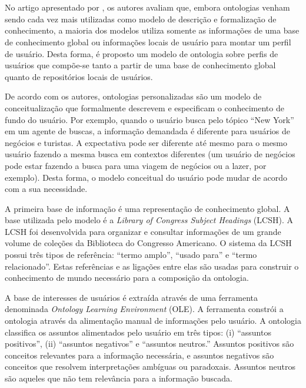 
\section{}

No artigo apresentado por , os autores avaliam que, embora ontologias venham sendo cada vez mais utilizadas como modelo de descrição e formalização de conhecimento, a maioria dos modelos utiliza somente as informações de uma base de conhecimento global ou informações locais de usuário para montar um perfil de usuário. Desta forma, é proposto um modelo de ontologia sobre perfis de usuários que compõe-se tanto a partir de uma base de conhecimento global quanto de repositórios locais de usuários.

De acordo com os autores, ontologias personalizadas são um modelo de conceitualização que formalmente descrevem e especificam o conhecimento de fundo do usuário. Por exemplo, quando o usuário busca pelo tópico ``New York'' em um agente de buscas, a informação demandada é diferente para usuários de negócios e turistas. A expectativa pode ser diferente até mesmo para o mesmo usuário fazendo a mesma busca em contextos diferentes (um usuário de negócios pode estar fazendo a busca para uma viagem de negócios ou a lazer, por exemplo). Desta forma, o modelo conceitual do usuário pode mudar de acordo com a sua necessidade.

A primeira base de informação é uma representação de conhecimento global. A base utilizada pelo modelo é a {\it Library of Congress Subject Headings} (LCSH). A LCSH foi desenvolvida para organizar e consultar informações de um grande volume de coleções da Biblioteca do Congresso Americano. O sistema da LCSH possui três tipos de referência: ``termo amplo'', ``usado para'' e ``termo relacionado''. Estas referências e as ligações entre elas são usadas para construir o conhecimento de mundo necessário para a composição da ontologia.

A base de interesses de usuários é extraída através de uma ferramenta denominada {\it Ontology Learning Environment} (OLE). A ferramenta constrói a ontologia através da alimentação manual de informações pelo usuário. A ontologia classifica os assuntos alimentados pelo usuário em três tipos: (i) ``assuntos positivos'', (ii) ``assuntos negativos'' e ``assuntos neutros.'' Assuntos positivos são conceitos relevantes para a informação necessária, e assuntos negativos são conceitos que resolvem interpretações ambíguas ou paradoxais. Assuntos neutros são aqueles que não tem relevância para a informação buscada.

